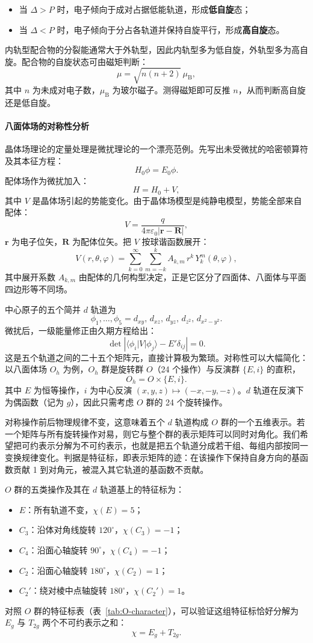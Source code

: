 \documentclass[UTF8]{ctexbook}
\begin{document}
\begin{itemize}
  \item 当 $\Delta>P$ 时，电子倾向于成对占据低能轨道，形成\textbf{低自旋}态；
  \item 当 $\Delta<P$ 时，电子倾向于分占各轨道并保持自旋平行，形成\textbf{高自旋}态。
\end{itemize}

内轨型配合物的分裂能通常大于外轨型，因此内轨型多为低自旋，外轨型多为高自旋。配合物的自旋状态可由磁矩判断：
\[
\mu=\sqrt{n(n+2)}\,\mu_{\mathrm B},
\]
其中 $n$ 为未成对电子数，$\mu_{\mathrm B}$ 为玻尔磁子。测得磁矩即可反推 $n$，从而判断高自旋还是低自旋。

\paragraph{八面体场的对称性分析}

晶体场理论的定量处理是微扰理论的一个漂亮范例。先写出未受微扰的哈密顿算符及其本征方程：
\[
H_0\phi=E_0\phi .
\]
配体场作为微扰加入：
\[
H=H_0+V,
\]
其中 $V$ 是晶体场引起的势能变化。由于晶体场模型是纯静电模型，势能全部来自配体：
\[
V=\frac{q}{4\pi\varepsilon_0|\mathbf{r}-\mathbf{R}|},
\]
$\mathbf{r}$ 为电子位矢，$\mathbf{R}$ 为配体位矢。把 $V$ 按球谐函数展开：
\[
V(r,\theta,\varphi)=\sum_{k=0}^{\infty}\sum_{m=-k}^{k}
A_{k,m}\,r^k\,Y_k^m(\theta,\varphi),
\]
其中展开系数 $A_{k,m}$ 由配体的几何构型决定，正是它区分了四面体、八面体与平面四边形等不同场。

中心原子的五个简并 $d$ 轨道为
\[
\phi_1,\dots,\phi_5=d_{xy},\,d_{xz},\,d_{yz},\,d_{z^2},\,d_{x^2-y^2}.
\]
微扰后，一级能量修正由久期方程给出：
\[
\det\left|\langle\phi_i|V|\phi_j\rangle-E'\delta_{ij}\right|=0 .
\]
这是五个轨道之间的二十五个矩阵元，直接计算极为繁琐。对称性可以大幅简化：以八面体场 $O_h$ 为例，$O_h$ 群是旋转群 $O$（24 个操作）与反演群 $\{E,i\}$ 的直积，
\[
O_h=O\times\{E,i\}.
\]
其中 $E$ 为恒等操作，$i$ 为中心反演 $(x,y,z)\mapsto(-x,-y,-z)$。$d$ 轨道在反演下为偶函数（记为 $g$），因此只需考虑 $O$ 群的 24 个旋转操作。

对称操作前后物理规律不变，这意味着五个 $d$ 轨道构成 $O$ 群的一个五维表示。若一个矩阵与所有旋转操作对易，则它与整个群的表示矩阵可以同时对角化。我们希望把可约表示分解为不可约表示，也就是把五个轨道分成若干组、每组内部按同一变换规律变化。判据是特征标，即表示矩阵的迹：在该操作下保持自身方向的基函数贡献 1 到对角元，被混入其它轨道的基函数不贡献。

$O$ 群的五类操作及其在 $d$ 轨道基上的特征标为：
\begin{itemize}
  \item $E$：所有轨道不变，$\chi(E)=5$；
  \item $C_3$：沿体对角线旋转 $120^\circ$，$\chi(C_3)=-1$；
  \item $C_4$：沿面心轴旋转 $90^\circ$，$\chi(C_4)=-1$；
  \item $C_2$：沿面心轴旋转 $180^\circ$，$\chi(C_2)=1$；
  \item $C_2'$：绕对棱中点轴旋转 $180^\circ$，$\chi(C_2')=1$。
\end{itemize}
对照 $O$ 群的特征标表（表~\ref{tab:O-character}），可以验证这组特征标恰好分解为 $E_g$ 与 $T_{2g}$ 两个不可约表示之和：
\[
\chi=E_g+T_{2g}.
\]
\end{document}
